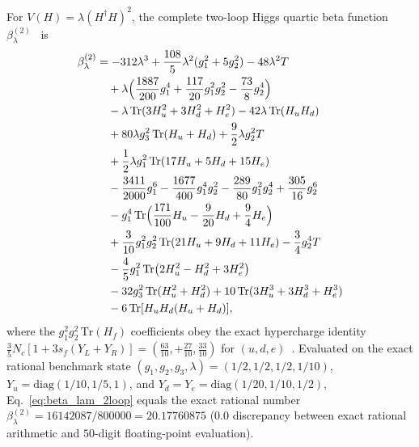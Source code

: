 \documentclass[aps,prd,twocolumn,nofootinbib,floatfix]{revtex4-2}
\begin{document}
For $V(H) = \lambda (H^\dagger H)^2$, the complete two-loop Higgs quartic beta function $\beta_\lambda^{(2)}$~\cite{LuoXiao2003,Buttazzo2013} is
\begin{align}
\label{eq:beta_lam_2loop}
\beta_\lambda^{(2)} &= -312\lambda^3 + \frac{108}{5}\lambda^2(g_1^2 + 5g_2^2) - 48\lambda^2 T \nonumber\\
&\quad + \lambda\Bigl(\frac{1887}{200}g_1^4 + \frac{117}{20}g_1^2 g_2^2 - \frac{73}{8}g_2^4\Bigr) \nonumber\\
&\quad - \lambda\,\mathrm{Tr}(3H_u^2 + 3H_d^2 + H_e^2) - 42\lambda\,\mathrm{Tr}(H_u H_d) \nonumber\\
&\quad + 80\lambda g_3^2\,\mathrm{Tr}(H_u + H_d) + \frac{9}{2}\lambda g_2^2 T \nonumber\\
&\quad + \frac{1}{2}\lambda g_1^2\,\mathrm{Tr}(17H_u + 5H_d + 15H_e) \nonumber\\
&\quad - \frac{3411}{2000}g_1^6 - \frac{1677}{400}g_1^4 g_2^2 - \frac{289}{80}g_1^2 g_2^4 + \frac{305}{16}g_2^6 \nonumber\\
&\quad - g_1^4\,\mathrm{Tr}\Bigl(\frac{171}{100}H_u - \frac{9}{20}H_d + \frac{9}{4}H_e\Bigr) \nonumber\\
&\quad + \frac{3}{10}g_1^2 g_2^2\,\mathrm{Tr}(21H_u + 9H_d + 11H_e) - \frac{3}{4}g_2^4 T \nonumber\\
&\quad - \frac{4}{5}g_1^2\,\mathrm{Tr}\bigl(2H_u^2 - H_d^2 + 3H_e^2\bigr) \nonumber\\
&\quad - 32g_3^2\,\mathrm{Tr}(H_u^2 + H_d^2) + 10\,\mathrm{Tr}(3H_u^3 + 3H_d^3 + H_e^3) \nonumber\\
&\quad - 6\,\mathrm{Tr}[H_u H_d(H_u + H_d)],
\end{align}
where the $g_1^2 g_2^2\,\mathrm{Tr}(H_f)$ coefficients obey the exact hypercharge identity $\frac{3}{5}N_c[1 + 3s_f(Y_L + Y_R)] = (\frac{63}{10}, +\frac{27}{10}, \frac{33}{10})$ for $(u, d, e)$~\cite{LuoXiao2003,Buttazzo2013}.
Evaluated on the exact rational benchmark state $(g_1, g_2, g_3, \lambda) = (1/2, 1/2, 1/2, 1/10)$, $Y_u = \mathrm{diag}(1/10, 1/5, 1)$, and $Y_d = Y_e = \mathrm{diag}(1/20, 1/10, 1/2)$, Eq.~\eqref{eq:beta_lam_2loop} equals the exact rational number $\beta_\lambda^{(2)} = 16142087 / 800000 = 20.17760875$ ($0.0$ discrepancy between exact rational arithmetic and $50$-digit floating-point evaluation).



\end{document}
